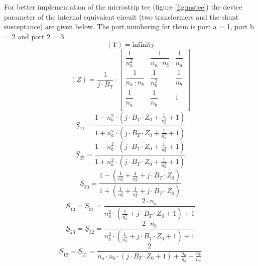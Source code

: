 For better implementation of the microstrip tee (figure \ref{fig:mstee})
the device parameter of the internal equivalent circuit (two transformers
and the shunt susceptance) are given below. The port numbering for them
is port a = 1, port b = 2 and port 2 = 3.
\begin{equation}
(\underline{Y}) = \text{infinity}
\end{equation}
\begin{equation}
(\underline{Z}) = \frac{1}{j\cdot B_T}\cdot
\begin{bmatrix}
\dfrac{1}{n_a^2}        & \dfrac{1}{n_a\cdot n_b} & \dfrac{1}{n_a} \\
\dfrac{1}{n_a\cdot n_b} & \dfrac{1}{n_b^2}        & \dfrac{1}{n_b} \\
\dfrac{1}{n_a}          & \dfrac{1}{n_b}          & 1 \\
\end{bmatrix}
\end{equation}
\begin{equation}
\underline{S}_{11} = \frac{1 - n_a^2\cdot (j\cdot B_T\cdot Z_0 + \frac{1}{n_b^2} + 1)}
                          {1 + n_a^2\cdot (j\cdot B_T\cdot Z_0 + \frac{1}{n_b^2} + 1)}
\end{equation}
\begin{equation}
\underline{S}_{22} = \frac{1 - n_b^2\cdot (j\cdot B_T\cdot Z_0 + \frac{1}{n_a^2} + 1)}
                          {1 + n_b^2\cdot (j\cdot B_T\cdot Z_0 + \frac{1}{n_a^2} + 1)}
\end{equation}
\begin{equation}
\underline{S}_{33} = \frac{1 - \left( \frac{1}{n_a^2} + \frac{1}{n_b^2} + j\cdot B_T\cdot Z_0 \right)}
                          {1 + \left( \frac{1}{n_a^2} + \frac{1}{n_b^2} + j\cdot B_T\cdot Z_0 \right)}
\end{equation}
\begin{equation}
\underline{S}_{13} = \underline{S}_{31} =
    \frac{2\cdot n_a}{n_a^2\cdot \left( \frac{1}{n_b^2} + j\cdot B_T\cdot Z_0 + 1\right) + 1}
\end{equation}
\begin{equation}
\underline{S}_{23} = \underline{S}_{32} =
    \frac{2\cdot n_b}{n_b^2\cdot \left( \frac{1}{n_a^2} + j\cdot B_T\cdot Z_0 + 1\right) + 1}
\end{equation}
\begin{equation}
\underline{S}_{12} = \underline{S}_{21} =
    \frac{2}{n_a\cdot n_b\cdot \left( j\cdot B_T\cdot Z_0 + 1\right) + \frac{n_a}{n_b} + \frac{n_b}{n_a}}
\end{equation}



